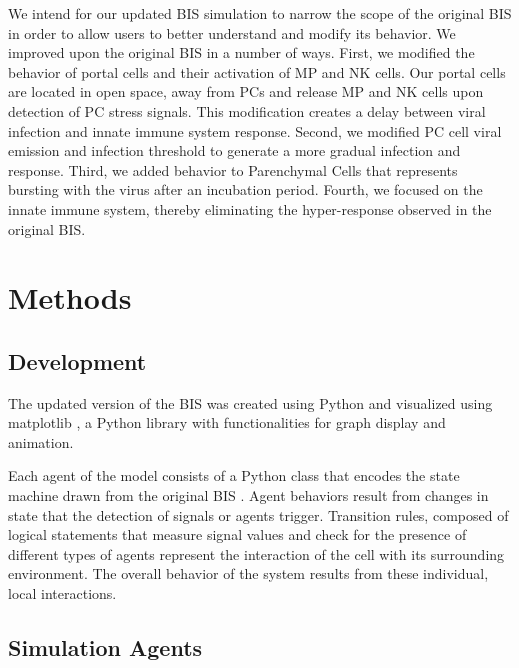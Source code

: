 \documentclass[10pt,conference]{IEEEtran}
\begin{document}
\indent
We intend for our updated BIS simulation to narrow the scope of the original BIS in order to allow users to better understand and modify its
behavior. We improved upon the original BIS in a number of ways. First, we modified the behavior of portal cells and their activation of MP
and NK cells. Our portal cells are located in open space, away from PCs and release MP and NK cells upon detection of PC stress signals.
This modification creates a delay between viral infection and innate immune system response. Second, we modified PC cell viral emission
and infection threshold to generate a more gradual infection and response. Third, we added behavior to Parenchymal Cells that represents
bursting with the virus after an incubation period. Fourth, we focused on the innate immune system, thereby eliminating the hyper-response
observed in the original BIS.

\vspace{.5in}
\section{Methods}
\subsection{Development}
The updated version of the BIS was created using Python and visualized using matplotlib \cite{Hunter:2007}, a Python library with
functionalities for graph display and animation.

\indent
Each agent of the model consists of a Python class that encodes the state machine drawn from the original BIS \cite{Folcik:2007}. Agent
behaviors result from changes in state that the detection of signals or agents trigger. Transition rules, composed of logical statements that
measure signal values and check for the presence of different types of agents represent the interaction of the cell with its surrounding
environment. The overall behavior of the system results from these individual, local interactions.

\subsection{Simulation Agents}
\end{document}
